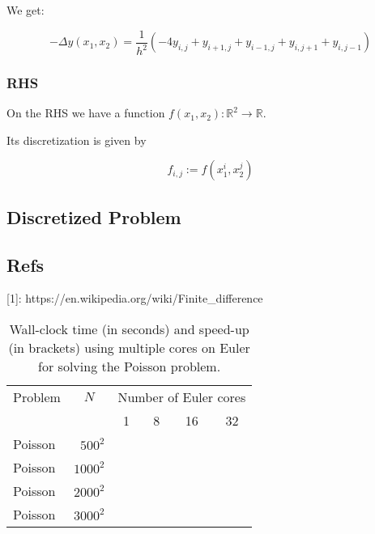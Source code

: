 \documentclass[unicode,11pt,a4paper,oneside,numbers=endperiod,openany]{scrartcl}
\begin{document}
We get:

\begin{equation}
  \boxed{
      -\Delta y(x_1,x_2) = \frac{1}{h^2} ( -4y_{i,j} + y_{i+1,j} + y_{i-1,j}
                           + y_{i, j+1} + y_{i,j-1} )
  }
\end{equation}

\subsubsection{RHS}
On the RHS we have a function $f(x_1, x_2): \mathbb R^2 \to \mathbb R$.

Its discretization is given by 

\begin{equation}
  \boxed{
    f_{i,j} := f(x_1^i, x_2^j)
  }
\end{equation}

\subsection{Discretized Problem}


\subsection{Refs}
[1]: https://en.wikipedia.org/wiki/Finite\_difference


\begin{table}[h]
	\caption{Wall-clock time (in seconds) and speed-up (in brackets) using multiple cores on Euler for solving the Poisson problem.}
	\centering
	
	\begin{tabular}{l|r||r|r|r|r}\hline\hline
		Problem & \multicolumn{1}{c||}{$N$} &  \multicolumn{4}{c}{Number of Euler cores} \\
		&       & \multicolumn{1}{c|}{1} & \multicolumn{1}{c|}{8} & \multicolumn{1}{c|}{16} & \multicolumn{1}{c}{32} \\
		\hline\hline
		{ Poisson} & $500^2$  &    \phantom{222222}        &    \phantom{222222}      & \phantom{222222}         &      \phantom{222222} \\
		{ Poisson} & $1000^2$ &            &          &          &       \\
		{ Poisson} & $2000^2$ &            &          &          &       \\
		{ Poisson} & $3000^2$ &            &          &          &       \\\hline \hline
	\end{tabular}
	
	\label{tab:PDEparallel1}
\end{table}
\end{document}
